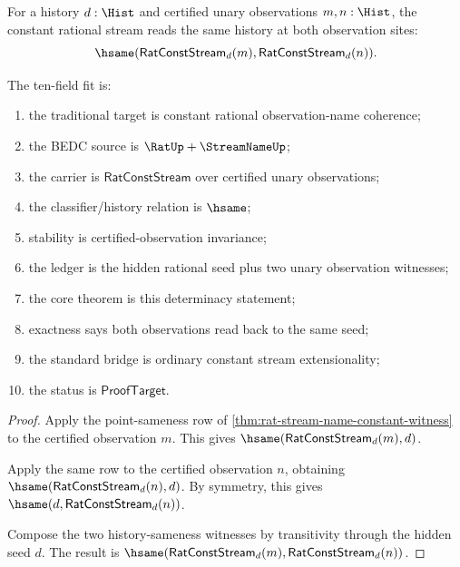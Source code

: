 \begin{theorem}
\label{thm:rat-const-stream-certified-observation-determinacy}
For a history $d:\Hist$ and certified unary observations $m,n:\Hist$, the
constant rational stream reads the same history at both observation sites:
$$
\hsame(\mathsf{RatConstStream}_d(m),\mathsf{RatConstStream}_d(n)).
$$

The ten-field fit is:
\begin{enumerate}
  \item the traditional target is constant rational observation-name coherence;
  \item the BEDC source is $\RatUp+\StreamNameUp$;
  \item the carrier is $\mathsf{RatConstStream}$ over certified unary
  observations;
  \item the classifier/history relation is $\hsame$;
  \item stability is certified-observation invariance;
  \item the ledger is the hidden rational seed plus two unary observation
  witnesses;
  \item the core theorem is this determinacy statement;
  \item exactness says both observations read back to the same seed;
  \item the standard bridge is ordinary constant stream extensionality;
  \item the status is $\mathsf{ProofTarget}$.
\end{enumerate}
\end{theorem}
\begin{proof}
Apply the point-sameness row of
\autoref{thm:rat-stream-name-constant-witness} to the certified observation
$m$. This gives $\hsame(\mathsf{RatConstStream}_d(m),d)$.

Apply the same row to the certified observation $n$, obtaining
$\hsame(\mathsf{RatConstStream}_d(n),d)$. By symmetry, this gives
$\hsame(d,\mathsf{RatConstStream}_d(n))$.

Compose the two history-sameness witnesses by transitivity through the hidden
seed $d$. The result is
$\hsame(\mathsf{RatConstStream}_d(m),\mathsf{RatConstStream}_d(n))$.
\end{proof}

